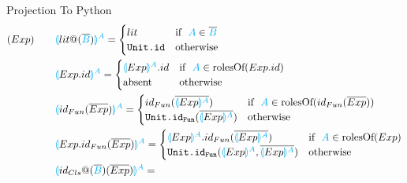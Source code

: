 \documentclass[11pt]{jarticle}
\begin{document}
Projection To Python
\begin{alignat*}{2}
  &(Exp)~~~ &&\color{cyan}\llparenthesis \color{black}lit@(\overline{\color{cyan}B}\color{black}) \color{cyan}\rrparenthesis^A \color{black}=
  \begin{cases}
    lit & \text{if}~~ \color{cyan}A \color{black}\in \overline{\color{cyan}B}\\
    \texttt{Unit.id} &\text{otherwise}
  \end{cases}\\
  &&&\color{cyan}\llparenthesis \color{black}Exp.id \color{cyan}\rrparenthesis^A \color{black}= 
  \begin{cases}
    \color{cyan}\llparenthesis \color{black}Exp \color{cyan}\rrparenthesis^A \color{black}.id &\text{if}~~\color{cyan}A \color{black} \in \text{rolesOf} (Exp.id)\\
    \text{absent} &\text{otherwise}
  \end{cases}\\
  &&&\color{cyan}\llparenthesis \color{black}id_{Fun}(\overline{Exp}) \color{cyan}\rrparenthesis^A \color{black}=
  \begin{cases}
    id_{Fun}(\overline{\color{cyan}\llparenthesis \color{black}Exp \color{cyan}\rrparenthesis^A}) &\color{black}\text{if}~~ \color{cyan}A \color{black} \in \text{rolesOf} (id_{Fun}(\overline{Exp}))\\
    \texttt{Unit.id}_\texttt{Fun}(\overline{\color{cyan}\llparenthesis \color{black}Exp \color{cyan}\rrparenthesis^A}) &\color{black} \text{otherwise}
  \end{cases}\\
  &&&\color{cyan}\llparenthesis \color{black}Exp.id_{Fun}(\overline{Exp}) \color{cyan}\rrparenthesis^A \color{black}=
  \begin{cases}
    \color{cyan}\llparenthesis \color{black}Exp \color{cyan}\rrparenthesis^A \color{black}.id_{Fun}(\overline{\color{cyan}\llparenthesis \color{black}Exp \color{cyan}\rrparenthesis^A}) &\text{if}~~ \color{cyan}A \color{black} \in \text{rolesOf}(Exp)\\
    \texttt{Unit.id}_\texttt{Fun}(\color{cyan}\llparenthesis \color{black}Exp \color{cyan}\rrparenthesis^A\color{black},\overline{\color{cyan}\llparenthesis \color{black}Exp \color{cyan}\rrparenthesis^A}) &\color{black} \text{otherwise}
  \end{cases}\\
  &&&\color{cyan}\llparenthesis \color{black}id_{Cls}@(\overline{\color{cyan}B}\color{black})(\overline{Exp}) \color{cyan}\rrparenthesis^A \color{black}=

\end{alignat*}
\end{document}
